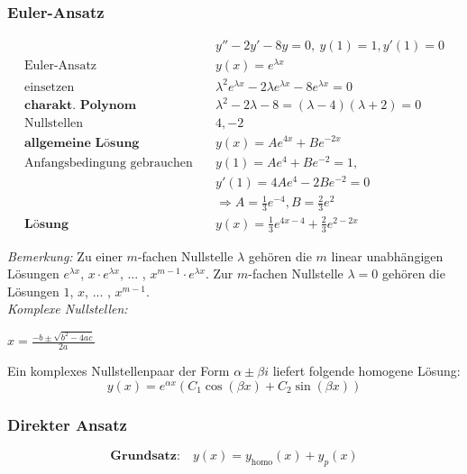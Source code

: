 \subsubsection{Euler-Ansatz}

\begin{equation*}
\begin{split}
& y'' - 2y' - 8y = 0,\ y(1) = 1, y'(1) = 0 \\
\text{Euler-Ansatz}\quad & y(x) = e^{\lambda x} \\
\text{einsetzen}\quad & \lambda^2 e^{\lambda x} - 2\lambda e^{\lambda x} - 8e^{\lambda x} = 0 \\
\textbf{charakt. Polynom}\quad & \lambda^2 - 2\lambda - 8 = (\lambda - 4)(\lambda + 2) = 0 \\
\text{Nullstellen}\quad & 4, -2 \\
\textbf{allgemeine L{\"o}sung}\quad & y(x) = Ae^{4x} + Be^{-2x} \\
\text{Anfangsbedingung gebrauchen}\quad & y(1) = Ae^4 + Be^{-2} =1,\\ &y'(1) = 4Ae^4 - 2Be^{-2} = 0 \\
& \Rightarrow A = \frac{1}{3}e^{-4}, B = \frac{2}{3}e^2 \\
\textbf{L{\"o}sung}\quad & y(x) = \frac{1}{3}e^{4x-4} + \frac{2}{3}e^{2-2x}
\end{split}
\end{equation*}

\emph{Bemerkung:} Zu einer $m$-fachen Nullstelle $\lambda$ geh{\"o}ren die $m$ linear unabh{\"a}ngigen L{\"o}sungen $e^{\lambda x}$, $x\cdot e^{\lambda x}$, ... , $x^{m-1}\cdot e^{\lambda x}$. Zur $m$-fachen Nullstelle $\lambda = 0$ geh{\"o}ren die L{\"o}sungen $1$, $x$, ... , $x^{m-1}$. \\

\emph{Komplexe Nullstellen:}


$x = \frac{-b \pm \sqrt{b^2-4ac}}{2a}$


Ein komplexes Nullstellenpaar der Form $\alpha \pm \beta i$ liefert folgende homogene L{\"o}sung:
\begin{equation*}
y(x)=e^{\alpha x}(C_1\cos(\beta x) + C_2\sin(\beta x))
\end{equation*}



\subsubsection{Direkter Ansatz}

\begin{equation*}
\textbf{Grundsatz:}\quad y(x) = y_\text{homo}(x) + y_p(x)
\end{equation*}

